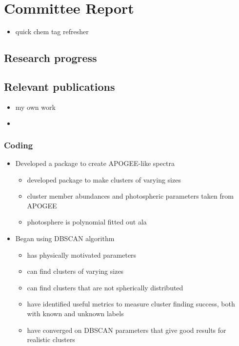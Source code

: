 \documentclass[11pt]{article}
\begin{document}
    
    \section*{Committee Report}
    
    \begin{itemize}
    	\item quick chem tag refresher
    \end{itemize}
   
    \subsection*{Research progress}
    
    \subsection*{Relevant publications}
    
    \begin{itemize}
    \item my own work
    \item 
    \end{itemize}
    
    \subsubsection*{Coding}
    
    \begin{itemize}
    	\item Developed a package to create APOGEE-like spectra
    	\begin{itemize}
    		\item developed package to make clusters of varying sizes
    		\item cluster member abundances and photospheric parameters taken from APOGEE
    		\item photosphere is polynomial fitted out ala \citet{Price-Jones2017}
    	\end{itemize}
    	\item Began using DBSCAN algorithm
    	\begin{itemize}
    		\item has physically motivated parameters
    		\item can find clusters of varying sizes
    		\item can find clusters that are not spherically distributed
    		\item have identified useful metrics to measure cluster finding success, both with known and unknown labels
    		\item have converged on DBSCAN parameters that give good results for realistic clusters
    	\end{itemize}
    \end{itemize}
    
\end{document}
